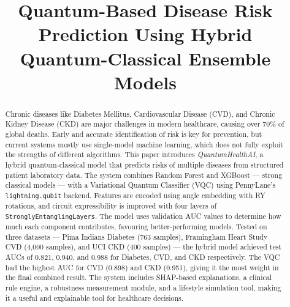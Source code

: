 ﻿\documentclass[conference]{IEEEtran}
\begin{document}
\title{Quantum-Based Disease Risk Prediction Using Hybrid\\Quantum-Classical Ensemble Models}

\author{
}

\maketitle

\begin{abstract}
Chronic diseases like Diabetes Mellitus, Cardiovascular Disease (CVD), and Chronic
Kidney Disease (CKD) are major challenges in modern healthcare, causing over 70\% of
global deaths. Early and accurate identification of risk is key for prevention, but
current systems mostly use single-model machine learning, which does not fully exploit
the strengths of different algorithms. This paper introduces \textit{QuantumHealthAI},
a hybrid quantum-classical model that predicts risks of multiple diseases from structured
patient laboratory data. The system combines Random Forest and XGBoost --- strong
classical models --- with a Variational Quantum Classifier (VQC) using PennyLane's
\texttt{lightning.qubit} backend. Features are encoded using angle embedding with RY
rotations, and circuit expressibility is improved with four layers of
\texttt{StronglyEntanglingLayers}. The model uses validation AUC values to determine
how much each component contributes, favouring better-performing models. Tested on three
datasets --- Pima Indians Diabetes (763 samples), Framingham Heart Study CVD (4,000
samples), and UCI CKD (400 samples) --- the hybrid model achieved test AUCs of 0.821,
0.940, and 0.988 for Diabetes, CVD, and CKD respectively. The VQC had the highest AUC
for CVD (0.898) and CKD (0.951), giving it the most weight in the final combined result.
The system includes SHAP-based explanations, a clinical rule engine, a robustness
measurement module, and a lifestyle simulation tool, making it a useful and explainable
tool for healthcare decisions.
\end{abstract}
\end{document}
